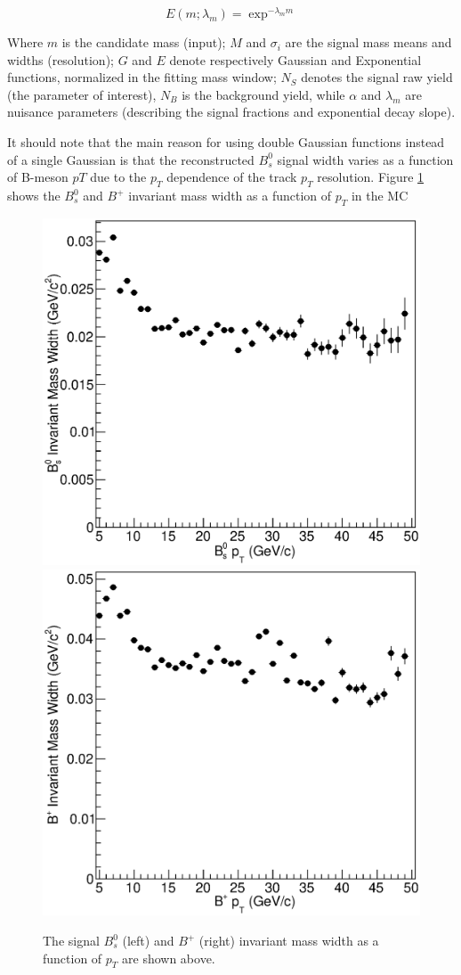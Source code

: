 \begin{equation}
E(m;\lambda_m) = \exp^{-\lambda_m m}
\end{equation}

Where $m$ is the candidate mass (input); $M$ and $\sigma_i$ are the signal mass means and widths (resolution); $G$ and $E$ denote respectively Gaussian and Exponential functions, normalized in the fitting mass window; $N_S$ denotes the signal raw yield (the parameter of interest),  $N_B$ is the background yield, while $\alpha$ and $\lambda_m$ are nuisance parameters (describing the signal fractions and exponential decay slope). %

It should note that the main reason for using double Gaussian functions instead of a single Gaussian is that the reconstructed $B^0_s$ signal width varies as a function of B-meson $pT$ due to the $p_T$ dependence of the track $p_T$ resolution. Figure \ref{BsBPWidthPT} shows the $B^0_s$ and $B^+$ invariant mass width as a function of $p_T$ in the MC


\begin{figure}[ht!]
\centering
\includegraphics[width=0.48\linewidth]{Figures/Chapter5/BsHisPtWidth.eps}
\includegraphics[width=0.48\linewidth]{Figures/Chapter5/BPHisPtWidth.eps}
\caption{The signal $B^0_s$ (left) and $B^+$ (right) invariant mass width as a function of $p_T$ are shown above.}
\label{BsBPWidthPT}
\end{figure}


